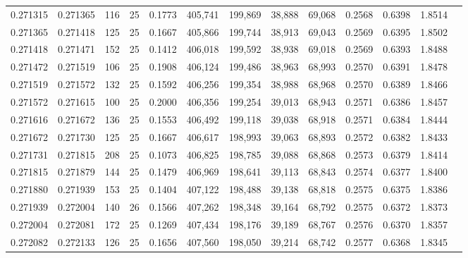 \begin{tabular}{rrrrrrrrrrrrr}
0.271315 & 0.271365 &   116 &  25 &                                     0.1773 & 405,741 & 199,869 &  38,888 &  69,068 & 0.2568 & 0.6398 & 1.8514 \\
0.271365 & 0.271418 &   125 &  25 &                                     0.1667 & 405,866 & 199,744 &  38,913 &  69,043 & 0.2569 & 0.6395 & 1.8502 \\
0.271418 & 0.271471 &   152 &  25 &                                     0.1412 & 406,018 & 199,592 &  38,938 &  69,018 & 0.2569 & 0.6393 & 1.8488 \\
0.271472 & 0.271519 &   106 &  25 &                                     0.1908 & 406,124 & 199,486 &  38,963 &  68,993 & 0.2570 & 0.6391 & 1.8478 \\
0.271519 & 0.271572 &   132 &  25 &                                     0.1592 & 406,256 & 199,354 &  38,988 &  68,968 & 0.2570 & 0.6389 & 1.8466 \\
0.271572 & 0.271615 &   100 &  25 &                                     0.2000 & 406,356 & 199,254 &  39,013 &  68,943 & 0.2571 & 0.6386 & 1.8457 \\
0.271616 & 0.271672 &   136 &  25 &                                     0.1553 & 406,492 & 199,118 &  39,038 &  68,918 & 0.2571 & 0.6384 & 1.8444 \\
0.271672 & 0.271730 &   125 &  25 &                                     0.1667 & 406,617 & 198,993 &  39,063 &  68,893 & 0.2572 & 0.6382 & 1.8433 \\
0.271731 & 0.271815 &   208 &  25 &                                     0.1073 & 406,825 & 198,785 &  39,088 &  68,868 & 0.2573 & 0.6379 & 1.8414 \\
0.271815 & 0.271879 &   144 &  25 &                                     0.1479 & 406,969 & 198,641 &  39,113 &  68,843 & 0.2574 & 0.6377 & 1.8400 \\
0.271880 & 0.271939 &   153 &  25 &                                     0.1404 & 407,122 & 198,488 &  39,138 &  68,818 & 0.2575 & 0.6375 & 1.8386 \\
0.271939 & 0.272004 &   140 &  26 &                                     0.1566 & 407,262 & 198,348 &  39,164 &  68,792 & 0.2575 & 0.6372 & 1.8373 \\
0.272004 & 0.272081 &   172 &  25 &                                     0.1269 & 407,434 & 198,176 &  39,189 &  68,767 & 0.2576 & 0.6370 & 1.8357 \\
0.272082 & 0.272133 &   126 &  25 &                                     0.1656 & 407,560 & 198,050 &  39,214 &  68,742 & 0.2577 & 0.6368 & 1.8345 \\

\end{tabular}
